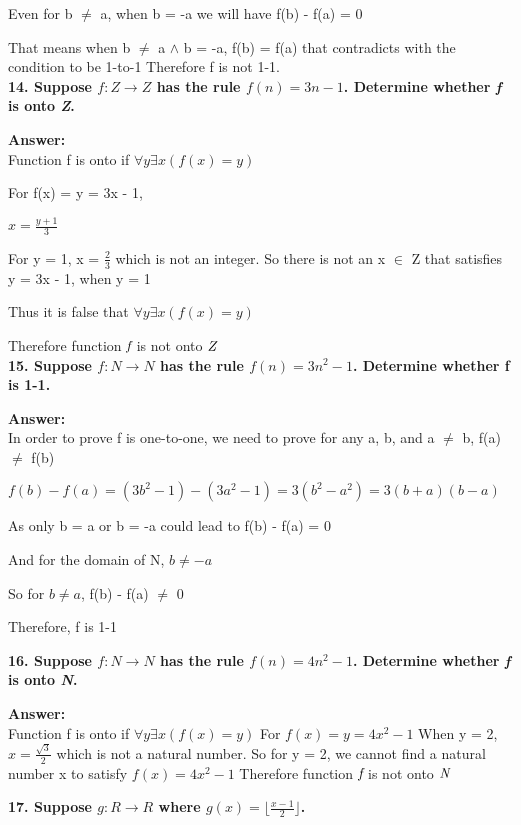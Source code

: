 \documentclass{article}
\begin{document}
\begin{large}
Even for b $\neq$ a, when b = -a we will have f(b) - f(a) = 0

That means when b $\neq$ a $\land$ b = -a, f(b) = f(a) that contradicts with the condition to be 1-to-1
Therefore f is not 1-1.\\


\textbf{14. Suppose $f:Z\to Z$ has the rule $f(n)=3n-1$. Determine whether \emph{f} is onto \emph{Z}.}

\textbf{Answer:} \\

Function f is onto if $\forall y \exists x (f(x) = y)$

For f(x) = y = 3x - 1, 

$x = \frac{y+1}{3}$

For y = 1, x = $\frac{2}{3}$ which is not an integer. So there is not an x $\in$ Z that satisfies y = 3x - 1, when y = 1

Thus it is false that $\forall y \exists x (f(x) = y)$

Therefore function $\emph{f}$ is not onto $\emph{Z}$\\


\textbf{15. Suppose $f:N\to N$ has the rule $f(n)=3{n^{2}}-1$. Determine whether f is 1-1.}

\textbf{Answer:} \\

In order to prove f is one-to-one, we need to prove for any a, b, and a $\neq$ b, f(a) $\neq$ f(b)

$f(b) - f(a) = (3b^2 - 1) - (3a^2 - 1) = 3(b^2 - a^2) = 3(b + a)(b - a)$

As only b = a or b = -a could lead to f(b) - f(a) = 0

And for the domain of N, $b \neq -a$

So for $b \neq a$, f(b) - f(a) $\neq$ 0

Therefore, f is 1-1


\textbf{16. Suppose $f:N\to N$ has the rule $f(n)=4n^2-1$. Determine whether \emph{f} is onto \emph{N}.}

\textbf{Answer:} \\

Function f is onto if $\forall y \exists x (f(x) = y)$
For $f(x) = y = 4x^2 - 1$
When y = 2, $x = \frac{\sqrt 3}{2}$ which is not a natural number.
So for y = 2, we cannot find a natural number x to satisfy $f(x) = 4x^2 - 1$
Therefore function $\emph{f}$ is not onto $\emph{N}$


\textbf{17. Suppose $g:R\to R$ where $g(x)=\lfloor \frac{x-1}{2}\rfloor$.}


\end{large}
\end{document}

